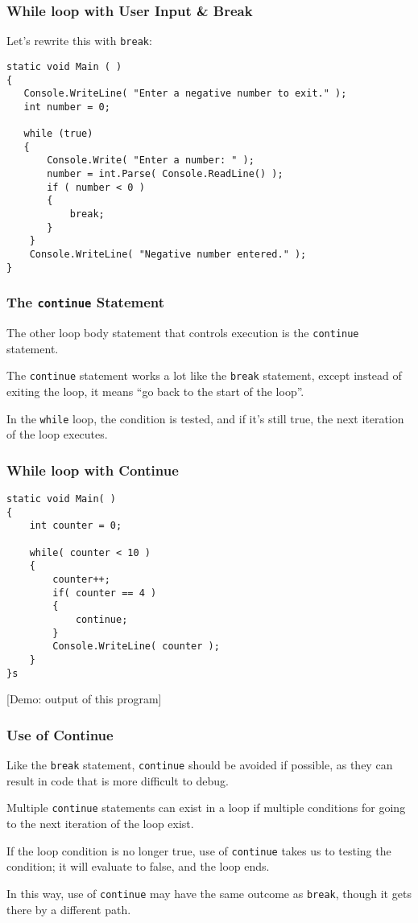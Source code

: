 \begin{frame}[fragile]
\frametitle{While loop with User Input \& Break}

Let's rewrite this with \texttt{break}:

\begin{verbatim}
static void Main ( )
{
   Console.WriteLine( "Enter a negative number to exit." );
   int number = 0;
    
   while (true) 
   {
       Console.Write( "Enter a number: " );
       number = int.Parse( Console.ReadLine() );
       if ( number < 0 )
       {
           break;
       }
    }
    Console.WriteLine( "Negative number entered." );
}    

\end{verbatim}
\end{frame}

\begin{frame}
\frametitle{The \texttt{continue} Statement}
The other loop body statement that controls execution is the \texttt{continue} statement.

The \texttt{continue} statement works a lot like the \texttt{break} statement, except instead of exiting the loop, it means ``go back to the start of the loop''.

In the \texttt{while} loop, the condition is tested, and if it's still true, the next iteration of the loop executes.

\end{frame}

\begin{frame}[fragile]
\frametitle{While loop with Continue}

\begin{verbatim}
static void Main( )
{
    int counter = 0;

    while( counter < 10 )
    {
        counter++;
        if( counter == 4 )
        {
            continue;
        }
        Console.WriteLine( counter );
    }
}s
\end{verbatim}

[Demo: output of this program]

\end{frame}

\begin{frame}
\frametitle{Use of Continue}
Like the \texttt{break} statement, \texttt{continue} should be avoided if possible, as they can result in code that is more difficult to debug.

Multiple \texttt{continue} statements can exist in a loop if multiple conditions for going to the next iteration of the loop exist.

If the loop condition is no longer true, use of \texttt{continue} takes us to testing the condition; it will evaluate to false, and the loop ends.

In this way, use of \texttt{continue} may have the same outcome as \texttt{break}, though it gets there by a different path.

\end{frame}

